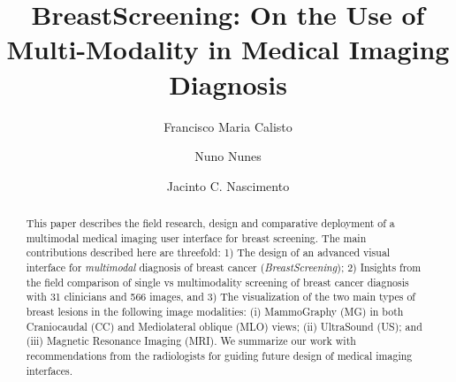\documentclass[sigconf]{acmart}
\begin{document}
\title[BreastScreening]{BreastScreening: On the Use of Multi-Modality in Medical Imaging Diagnosis}

\author{Francisco Maria Calisto}

\author{Nuno Nunes}

\author{Jacinto C. Nascimento}

\renewcommand{\shortauthors}{Calisto, et al.}

\begin{abstract}

This paper describes the field research, design and comparative deployment of a multimodal medical imaging user interface for breast screening.
The main contributions described here are threefold:
1) The design of an advanced visual interface for {\it multimodal} diagnosis of breast cancer ({\it BreastScreening});
2) Insights from the field comparison of single vs multimodality screening of breast cancer diagnosis with 31 clinicians and 566 images, and
3) The visualization of the two main types of breast lesions in the following image modalities:
(i) MammoGraphy (MG) in both 
Craniocaudal (CC) and Mediolateral oblique (MLO) views;
(ii) UltraSound (US); and
(iii) Magnetic Resonance Imaging (MRI).
We summarize our work with recommendations from the radiologists for guiding future design of medical imaging interfaces.

\end{abstract}
\end{document}
